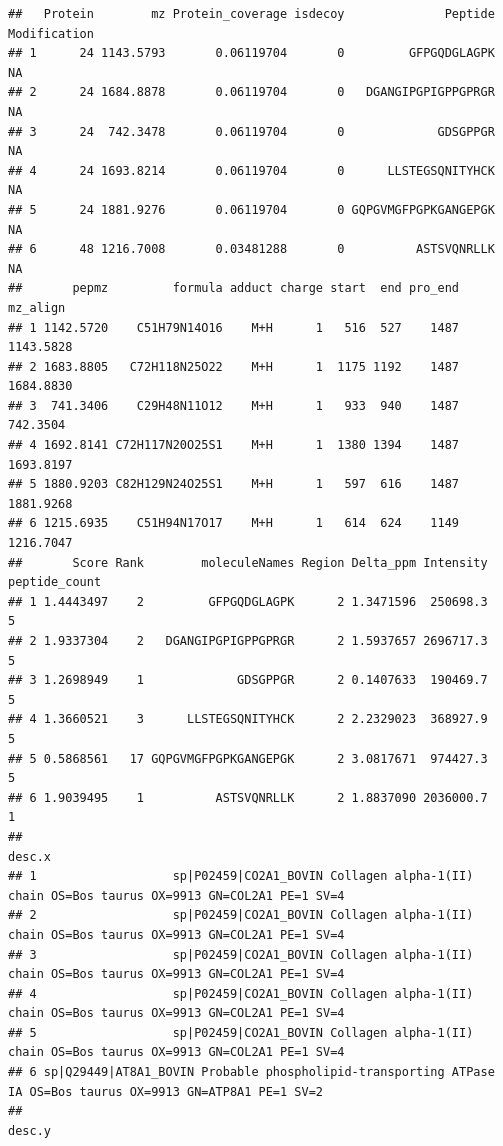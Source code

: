 \documentclass[
]{article}
\begin{document}
\begin{verbatim}
##   Protein        mz Protein_coverage isdecoy              Peptide Modification
## 1      24 1143.5793       0.06119704       0         GFPGQDGLAGPK           NA
## 2      24 1684.8878       0.06119704       0   DGANGIPGPIGPPGPRGR           NA
## 3      24  742.3478       0.06119704       0             GDSGPPGR           NA
## 4      24 1693.8214       0.06119704       0      LLSTEGSQNITYHCK           NA
## 5      24 1881.9276       0.06119704       0 GQPGVMGFPGPKGANGEPGK           NA
## 6      48 1216.7008       0.03481288       0          ASTSVQNRLLK           NA
##       pepmz         formula adduct charge start  end pro_end  mz_align
## 1 1142.5720    C51H79N14O16    M+H      1   516  527    1487 1143.5828
## 2 1683.8805   C72H118N25O22    M+H      1  1175 1192    1487 1684.8830
## 3  741.3406    C29H48N11O12    M+H      1   933  940    1487  742.3504
## 4 1692.8141 C72H117N20O25S1    M+H      1  1380 1394    1487 1693.8197
## 5 1880.9203 C82H129N24O25S1    M+H      1   597  616    1487 1881.9268
## 6 1215.6935    C51H94N17O17    M+H      1   614  624    1149 1216.7047
##       Score Rank        moleculeNames Region Delta_ppm Intensity peptide_count
## 1 1.4443497    2         GFPGQDGLAGPK      2 1.3471596  250698.3             5
## 2 1.9337304    2   DGANGIPGPIGPPGPRGR      2 1.5937657 2696717.3             5
## 3 1.2698949    1             GDSGPPGR      2 0.1407633  190469.7             5
## 4 1.3660521    3      LLSTEGSQNITYHCK      2 2.2329023  368927.9             5
## 5 0.5868561   17 GQPGVMGFPGPKGANGEPGK      2 3.0817671  974427.3             5
## 6 1.9039495    1          ASTSVQNRLLK      2 1.8837090 2036000.7             1
##                                                                                                         desc.x
## 1                   sp|P02459|CO2A1_BOVIN Collagen alpha-1(II) chain OS=Bos taurus OX=9913 GN=COL2A1 PE=1 SV=4
## 2                   sp|P02459|CO2A1_BOVIN Collagen alpha-1(II) chain OS=Bos taurus OX=9913 GN=COL2A1 PE=1 SV=4
## 3                   sp|P02459|CO2A1_BOVIN Collagen alpha-1(II) chain OS=Bos taurus OX=9913 GN=COL2A1 PE=1 SV=4
## 4                   sp|P02459|CO2A1_BOVIN Collagen alpha-1(II) chain OS=Bos taurus OX=9913 GN=COL2A1 PE=1 SV=4
## 5                   sp|P02459|CO2A1_BOVIN Collagen alpha-1(II) chain OS=Bos taurus OX=9913 GN=COL2A1 PE=1 SV=4
## 6 sp|Q29449|AT8A1_BOVIN Probable phospholipid-transporting ATPase IA OS=Bos taurus OX=9913 GN=ATP8A1 PE=1 SV=2
##                                                                                                         desc.y

\end{verbatim}
\end{document}
